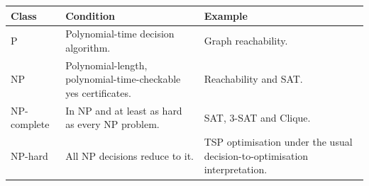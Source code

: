 \documentclass[12pt,a4paper]{article}
\begin{document}
\begin{tcolorbox}[tikzbox, title={Summary Comparison}]
\par\vspace{5pt}
\begingroup
\setlength{\extrarowheight}{1pt}
\noindent\begin{tabularx}{\linewidth}{|B{3.45cm}|Y|Y|}
\hline
\textbf{Class} & \textbf{Condition} & \textbf{Example} \\ \hline
P & Polynomial-time decision algorithm. & Graph reachability. \\ \hline
NP & Polynomial-length, polynomial-time-checkable yes certificates. & Reachability and SAT. \\ \hline
NP-complete & In NP and at least as hard as every NP problem. & SAT, 3-SAT and Clique. \\ \hline
NP-hard & All NP decisions reduce to it. & TSP optimisation under the usual decision-to-optimisation interpretation. \\ \hline
\end{tabularx}\par
\endgroup
\end{tcolorbox}
\end{document}
